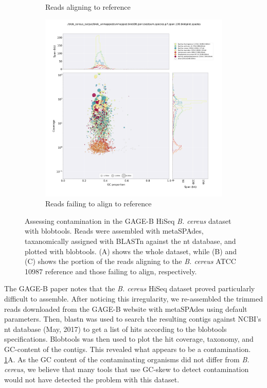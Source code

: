 \documentclass[10pt]{article}
\begin{document}
\begin{figure}[H]
\begin{subfigure}[b]{.5\textwidth}
    \caption{Reads aligning to reference}
  \end{subfigure}
  \begin{subfigure}[b]{.5\textwidth}
    \includegraphics[width=.95\textwidth]{unmapped.blobDB.json.bestsum.species.p7.span.100.blobplot.spades.png}
    \caption{Reads failing to align to reference}
  \end{subfigure}
  \caption{Assessing contamination in the GAGE-B HiSeq \textit{B. cereus} dataset with blobtools. Reads were assembled with metaSPAdes, taxanomically assigned with BLASTn against the nt database, and plotted with blobtools.  (A) shows the whole dataset, while (B) and (C) shows the portion of the reads aligning to the \textit{B. cereus} ATCC 10987 reference and those failing to align, respectively.}
  \label{fig:contamination_all}
\end{figure}

The GAGE-B paper \cite{Magoc2013} notes that the \textit{B. cereus} HiSeq dataset proved particularly difficult to assemble. After noticing this irregularity, we re-assembled the trimmed reads downloaded from the GAGE-B website with metaSPAdes \cite{Nurk2017}  using default parameters.  Then, blastn was used to search the resulting contigs against NCBI's nt database (May, 2017) to get a list of hits according to the blobtools \cite{Laetsch2017a} specifications. Blobtools was then used to plot the hit coverage, taxonomy, and GC-content of the contigs.  This revealed what appears to be a contamination. \ref{fig:contamination_all}A. As the GC content of the contaminating organisms did not differ from \textit{B. cereus}, we believe that many tools that use GC-skew to detect contamination would not have detected the problem with this dataset.
\end{document}
